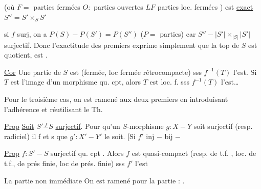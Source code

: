 (où $F={}$ parties fermées \quad $O:{}$ parties ouvertes \quad $LF$ parties loc. fermées ) est \uline{exact} \quad $S''=S'\times_S S'$


 si $f$ surj, on a \quad $P(S)\mathrel{-}P(S')= P(S'')$ \quad ($P={}$ parties) car $S''\mathrel{-}|S'|\times_{|S|}|S'|$ surjectif. Donc l'exactitude des   premiers exprime simplement que la top de $S$ est quotient,   est .

\uline{Cor} Une partie  de $S$ est  (fermée, loc fermée rétrocompacte) sss $f^{-1}(T)$ l'est. Si $T$ est l'image d'un morphisme qu. cpt, alors $T$ est loc. f. sss $f^{-1}(T)$ l'est\ldots

Pour le troisième cas, on est ramené aux deux premiers en introduisant l'adhérence et réutilisant le Th.

 


\uline{Prop} \uline{Soit} $S'\overset{f}{\mathrel{-}}S$ \uline{surjectif}. Pour qu'un $S$-morphisme $g:X\mathrel{-}Y$ soit surjectif (resp. radiciel) il f et s que $g':X'\mathrel{-}Y'$ le soit. [Si $f'$ inj $\mathrel{-}$ bij $\mathrel{-}$

\uline{Prop}  $f:S'\mathrel{-}S$ surjectif qu. cpt . Alors $f$ est quasi-compact  (resp. de t.f. \unsure{)}, loc. de t.f., de prés finie, loc de prés. finie) sss $f'$ l'est


La partie non  immédiate  On est ramené pour la partie  : .

